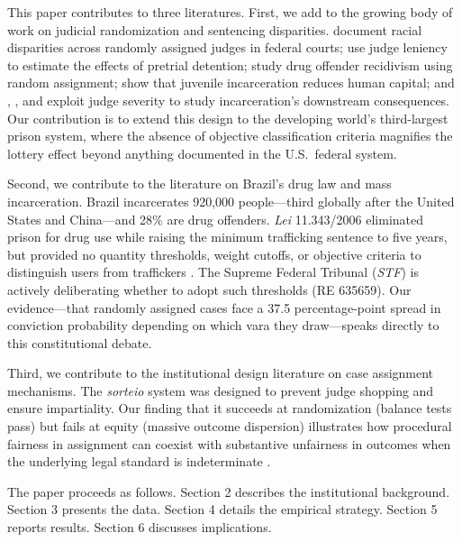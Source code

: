\documentclass[12pt]{article}
\begin{document}
This paper contributes to three literatures. First, we add to the growing body of work on judicial randomization and sentencing disparities. \citet{abrams2012} document racial disparities across randomly assigned judges in federal courts; \citet{dobbie2018} use judge leniency to estimate the effects of pretrial detention; \citet{green2010} study drug offender recidivism using random assignment; \citet{aizer2015} show that juvenile incarceration reduces human capital; and \citet{mueller2015}, \citet{bhuller2020}, and \citet{norris2021} exploit judge severity to study incarceration's downstream consequences. Our contribution is to extend this design to the developing world's third-largest prison system, where the absence of objective classification criteria magnifies the lottery effect beyond anything documented in the U.S.\ federal system.

Second, we contribute to the literature on Brazil's drug law and mass incarceration. Brazil incarcerates 920,000 people---third globally after the United States and China---and 28\% are drug offenders. \textit{Lei} 11.343/2006 eliminated prison for drug use while raising the minimum trafficking sentence to five years, but provided no quantity thresholds, weight cutoffs, or objective criteria to distinguish users from traffickers \citep{boiteux2006, jesusfilho2019}. The Supreme Federal Tribunal (\textit{STF}) is actively deliberating whether to adopt such thresholds (RE 635659). Our evidence---that randomly assigned cases face a 37.5 percentage-point spread in conviction probability depending on which vara they draw---speaks directly to this constitutional debate.

Third, we contribute to the institutional design literature on case assignment mechanisms. The \textit{sorteio} system was designed to prevent judge shopping and ensure impartiality. Our finding that it succeeds at randomization (balance tests pass) but fails at equity (massive outcome dispersion) illustrates how procedural fairness in assignment can coexist with substantive unfairness in outcomes when the underlying legal standard is indeterminate \citep{assuncao2023}.

The paper proceeds as follows. Section 2 describes the institutional background. Section 3 presents the data. Section 4 details the empirical strategy. Section 5 reports results. Section 6 discusses implications.

\end{document}
